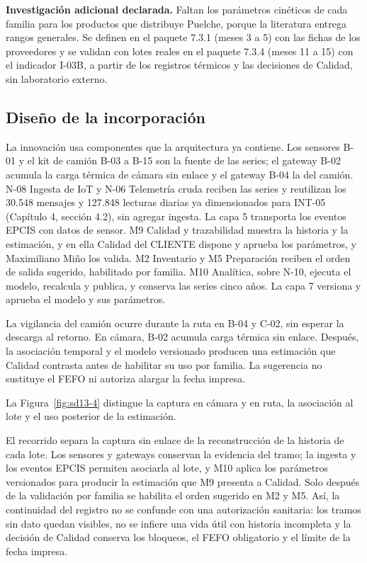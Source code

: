 \textbf{Investigación adicional declarada.} Faltan los parámetros cinéticos de cada familia para los productos que distribuye Puelche, porque la literatura entrega rangos generales. Se definen en el paquete 7.3.1 (meses 3 a 5) con las fichas de los proveedores y se validan con lotes reales en el paquete 7.3.4 (meses 11 a 15) con el indicador I-03B, a partir de los registros térmicos y las decisiones de Calidad, sin laboratorio externo.

\subsection{Diseño de la incorporación}

La innovación usa componentes que la arquitectura ya contiene. Los sensores B-01 y el kit de camión B-03 a B-15 son la fuente de las series; el gateway B-02 acumula la carga térmica de cámara sin enlace y el gateway B-04 la del camión. N-08 Ingesta de IoT y N-06 Telemetría cruda reciben las series y reutilizan los 30.548 mensajes y 127.848 lecturas diarias ya dimensionados para INT-05 (Capítulo 4, sección 4.2), sin agregar ingesta. La capa 5 transporta los eventos EPCIS con datos de sensor. M9 Calidad y trazabilidad muestra la historia y la estimación, y en ella Calidad del CLIENTE dispone y aprueba los parámetros, y Maximiliano Miño los valida. M2 Inventario y M5 Preparación reciben el orden de salida sugerido, habilitado por familia. M10 Analítica, sobre N-10, ejecuta el modelo, recalcula y publica, y conserva las series cinco años. La capa 7 versiona y aprueba el modelo y sus parámetros.

La vigilancia del camión ocurre durante la ruta en B-04 y C-02, sin esperar la descarga al retorno. En cámara, B-02 acumula carga térmica sin enlace. Después, la asociación temporal y el modelo versionado producen una estimación que Calidad contrasta antes de habilitar su uso por familia. La sugerencia no sustituye el FEFO ni autoriza alargar la fecha impresa.

La Figura~\ref{fig:sd13-4} distingue la captura en cámara y en ruta, la asociación al lote y el uso posterior de la estimación.


El recorrido separa la captura sin enlace de la reconstrucción de la historia de cada lote. Los sensores y gateways conservan la evidencia del tramo; la ingesta y los eventos EPCIS permiten asociarla al lote, y M10 aplica los parámetros versionados para producir la estimación que M9 presenta a Calidad. Solo después de la validación por familia se habilita el orden sugerido en M2 y M5. Así, la continuidad del registro no se confunde con una autorización sanitaria: los tramos sin dato quedan visibles, no se infiere una vida útil con historia incompleta y la decisión de Calidad conserva los bloqueos, el FEFO obligatorio y el límite de la fecha impresa.

